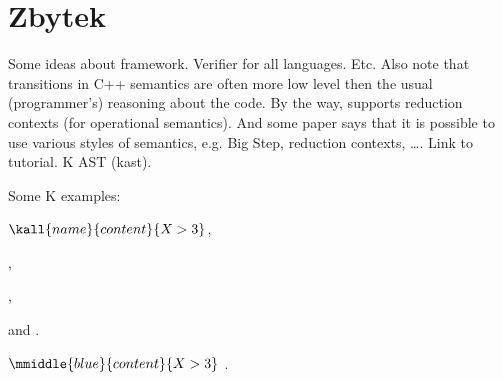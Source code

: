 \documentclass{fithesis3}
\begin{document}
\chapter{Zbytek}

Some ideas about \K framework. Verifier for all languages. Etc. Also note that transitions in C++ semantics are often more low level then the usual (programmer's) reasoning about the code. By the way, \K supports reduction contexts (for operational semantics). And some \K paper says that it is possible to use various styles of semantics, e.g. Big Step, reduction contexts, \ldots . Link to \K tutorial. K AST (kast).

\ifshowkexamples
Some K examples:

$\kall{name}{content}{X > 3}$,

,

,

and .

$\mmiddle{blue}{content}{X > 3}$
.

\fi


 
\end{document}
